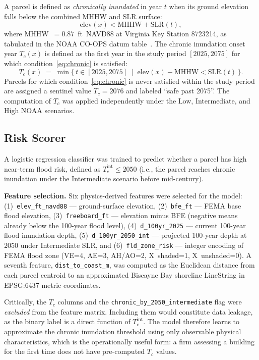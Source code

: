 \documentclass[conference]{IEEEtran}
\begin{document}
A parcel is defined as \textit{chronically inundated} in year $t$ when
its ground elevation falls below the combined MHHW and SLR surface:
\begin{equation}
  \text{elev}(x) < \text{MHHW} + \text{SLR}(t),
  \label{eq:chronic}
\end{equation}
where MHHW~$= 0.87$~ft~NAVD88 at Virginia Key Station 8723214,
as tabulated in the NOAA CO-OPS datum table~\cite{noaa_datums}.
The chronic inundation onset year $T_c(x)$ is defined as the first
year in the study period $[2025, 2075]$ for which
condition~\eqref{eq:chronic} is satisfied:
\begin{equation}
  T_c(x) \;=\; \min\bigl\{\, t \in [2025, 2075]
    \;\mid\; \text{elev}(x) - \text{MHHW} < \text{SLR}(t)\,\bigr\}.
  \label{eq:Tc}
\end{equation}
Parcels for which condition~\eqref{eq:chronic} is never satisfied
within the study period are assigned a sentinel value $T_c = 2076$
and labeled ``safe past 2075''.
The computation of $T_c$ was applied independently under the Low,
Intermediate, and High NOAA scenarios.

\subsection{Risk Scorer}

A logistic regression classifier was trained to predict whether a
parcel has high near-term flood risk, defined as $T_c^{\text{int}} \le 2050$
(i.e., the parcel reaches chronic inundation under the Intermediate
scenario before mid-century).

\textbf{Feature selection.}
Six physics-derived features were selected for the model:
(1)~\texttt{elev\_ft\_navd88} — ground-surface elevation,
(2)~\texttt{bfe\_ft} — FEMA base flood elevation,
(3)~\texttt{freeboard\_ft} — elevation minus BFE (negative means already
below the 100-year flood level),
(4)~\texttt{d\_100yr\_2025} — current 100-year flood inundation depth,
(5)~\texttt{d\_100yr\_2050\_int} — projected 100-year depth at 2050
under Intermediate SLR, and
(6)~\texttt{fld\_zone\_risk} — integer encoding of FEMA flood zone
(VE=4, AE=3, AH/AO=2, X~shaded=1, X~unshaded=0).
A seventh feature, \texttt{dist\_to\_coast\_m}, was computed as the
Euclidean distance from each parcel centroid to an approximated Biscayne
Bay shoreline LineString in EPSG:6437 metric coordinates.

Critically, the $T_c$ columns and the
\texttt{chronic\_by\_2050\_intermediate} flag were \textit{excluded}
from the feature matrix.
Including them would constitute data leakage, as the binary label is a
direct function of $T_c^{\text{int}}$.
The model therefore learns to approximate the chronic inundation
threshold using only observable physical characteristics, which is the
operationally useful form: a firm assessing a building for the first
time does not have pre-computed $T_c$ values.
\end{document}

